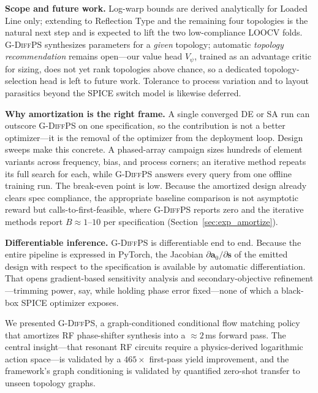 \documentclass[sigconf,anonymous,review]{acmart}
\newcommand{\gdiffps}{\textsc{G-DiffPS}}
\begin{document}
\textbf{Scope and future work.}
Log-warp bounds are derived analytically for Loaded Line only; extending
to Reflection Type and the remaining four topologies is the natural next
step and is expected to lift the two low-compliance LOOCV folds.
\gdiffps{} synthesizes parameters for a \emph{given} topology; automatic
\emph{topology recommendation} remains open---our value head $V_\psi$,
trained as an advantage critic for sizing, does not yet rank topologies
above chance, so a dedicated topology-selection head is left to future work.
Tolerance to process variation and to layout parasitics beyond the SPICE
switch model is likewise deferred.

\textbf{Why amortization is the right frame.}
A single converged DE or SA run can outscore \gdiffps{} on one specification, so
the contribution is not a better optimizer---it is the removal of the optimizer
from the deployment loop.  Design sweeps make this concrete.  A phased-array
campaign sizes hundreds of element variants across frequency, bias, and process
corners; an iterative method repeats its full search for each, while
\gdiffps{} answers every query from one offline training run.  The
break-even point is low.  Because the amortized design already clears spec
compliance, the appropriate baseline comparison is not asymptotic reward but
calls-to-first-feasible, where \gdiffps{} reports zero and the iterative
methods report $B\approx1$--$10$ per specification (Section~\ref{sec:exp_amortize}).

\textbf{Differentiable inference.}
\gdiffps{} is differentiable end to end.  Because the entire pipeline is
expressed in PyTorch, the Jacobian $\partial\mathbf{a}_0/\partial\mathbf{s}$ of
the emitted design with respect to the specification is available by
automatic differentiation.  That opens gradient-based sensitivity analysis and
secondary-objective refinement---trimming power, say, while holding phase
error fixed---none of which a black-box SPICE optimizer exposes.

We presented \gdiffps{}, a graph-conditioned conditional flow matching policy
that amortizes RF phase-shifter synthesis into a ${\approx}2$\,ms forward
pass.  The central insight---that resonant RF circuits require a
physics-derived logarithmic action space---is validated by a $465{\times}$
first-pass yield improvement, and the framework's graph conditioning is
validated by quantified zero-shot transfer to unseen topology graphs.

\end{document}
